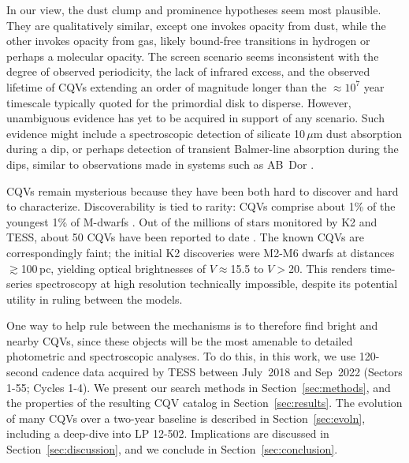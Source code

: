 \documentclass[11pt,twocolumn,tighten]{aastex63}
\begin{document}
In our view, the dust clump and prominence hypotheses seem most
plausible.  They are qualitatively similar, except one
invokes opacity from dust, while the other invokes opacity from gas,
likely bound-free transitions in hydrogen or perhaps a
molecular opacity.  The screen scenario seems inconsistent with the
degree of observed periodicity, the lack of infrared excess, and the
observed lifetime of CQVs extending an order of magnitude longer than
the $\approx$$10^7$ year timescale typically quoted for the primordial
disk to disperse.  However, unambiguous evidence 
has yet to be acquired in support of any scenario.  Such evidence
might include a spectroscopic detection of silicate 10\,$\mu$m dust
absorption during a dip, or perhaps detection of transient
Balmer-line absorption during the dips, similar to observations made in
systems such as AB~Dor \citep[see the review
by][]{1999ASPC..158..146C}.

CQVs remain mysterious because they have been both hard to discover
and hard to characterize.   Discoverability is tied to rarity: CQVs
comprise about 1\% of the youngest 1\% of M-dwarfs
\citep{2018AJ....155..196R}.  Out of the millions of stars monitored
by K2 and TESS, about 50 CQVs have been reported to date
\citep{2016AJ....152..114R,2017AJ....153..152S,2018AJ....155...63S,2019ApJ...876..127Z,2020AJ....160...86B,2022AJ....163..144G,2023ApJ...945..114P}.
The known CQVs are correspondingly faint; the initial K2 discoveries
\citep{2016AJ....152..114R,2017AJ....153..152S} were M2-M6 dwarfs at
distances $\gtrsim$100\,pc, yielding optical brightnesses of
$V$$\approx$15.5 to $V$$>$20.  This renders time-series spectroscopy
at high resolution technically impossible, despite its potential
utility in ruling between the models.

One way to help rule between the mechanisms is to therefore find
bright and nearby CQVs, since these objects will be the most amenable
to detailed photometric and spectroscopic analyses.  To do this, in
this work, we use 120-second cadence data acquired by TESS between
July~2018 and Sep~2022 (Sectors 1-55; Cycles 1-4).  We present our
search methods in Section~\ref{sec:methods}, and the properties of the
resulting CQV catalog in Section~\ref{sec:results}.  
The evolution of many CQVs over a two-year baseline is described
in Section~\ref{sec:evoln}, including a deep-dive into LP 12-502.
Implications 
are discussed in Section~\ref{sec:discussion}, and we conclude in
Section~\ref{sec:conclusion}.
\end{document}
